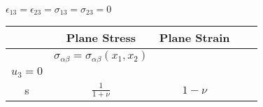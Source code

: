 \(\epsilon_{13}=\epsilon_{23}= \sigma_{13}=\sigma_{23}=0\)

\begin{longtable}[]{@{}ccccc@{}}
\toprule
\begin{minipage}[b]{0.08\columnwidth}\centering
\strut
\end{minipage} & \begin{minipage}[b]{0.40\columnwidth}\centering
Plane Stress\strut
\end{minipage} & \begin{minipage}[b]{0.34\columnwidth}\centering
Plane Strain\strut
\end{minipage} & \begin{minipage}[b]{0.01\columnwidth}\centering
\strut
\end{minipage} & \begin{minipage}[b]{0.01\columnwidth}\centering
\strut
\end{minipage}\tabularnewline
\midrule
\endhead
\begin{minipage}[t]{0.08\columnwidth}\centering
\strut
\end{minipage} & \begin{minipage}[t]{0.40\columnwidth}\centering
\(\sigma _{\alpha \beta }=\sigma _{\alpha \beta}\left(x_{1}, x_{2}\right)\)\strut
\end{minipage} & \begin{minipage}[t]{0.34\columnwidth}\centering
\(u_{\alpha }=u_{\alpha }\left(x_{1}, x_{2}\right)\\\) \(u_{3}=0\)\strut
\end{minipage} & \begin{minipage}[t]{0.01\columnwidth}\centering
\strut
\end{minipage} & \begin{minipage}[t]{0.01\columnwidth}\centering
\strut
\end{minipage}\tabularnewline
\begin{minipage}[t]{0.08\columnwidth}\centering
s\strut
\end{minipage} & \begin{minipage}[t]{0.40\columnwidth}\centering
\(\frac {1}{1+\nu }\)\strut
\end{minipage} & \begin{minipage}[t]{0.34\columnwidth}\centering
\(1-\nu\)\strut
\end{minipage} & \begin{minipage}[t]{0.01\columnwidth}\centering
\strut
\end{minipage} & \begin{minipage}[t]{0.01\columnwidth}\centering

\end{minipage}
\end{longtable}
